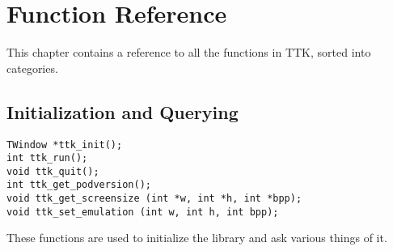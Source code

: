 \documentclass[12pt,letterpaper]{report}
\begin{document}
\chapter{Function Reference}
This chapter contains a reference to all the functions in TTK, sorted into categories.

\section{Initialization and Querying}
\begin{verbatim}
TWindow *ttk_init();
int ttk_run();
void ttk_quit();
int ttk_get_podversion();
void ttk_get_screensize (int *w, int *h, int *bpp);
void ttk_set_emulation (int w, int h, int bpp);
\end{verbatim}

These functions are used to initialize the library and ask various things of it.
\end{document}
